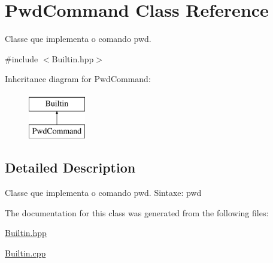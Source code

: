 \hypertarget{classPwdCommand}{
\section{PwdCommand Class Reference}
\label{classPwdCommand}
}


Classe que implementa o comando pwd.  




{\ttfamily \#include $<$Builtin.hpp$>$}

Inheritance diagram for PwdCommand:\begin{figure}[H]
\begin{center}
\leavevmode
\includegraphics[height=2.000000cm]{classPwdCommand}
\end{center}
\end{figure}


\subsection{Detailed Description}
Classe que implementa o comando pwd. Sintaxe: pwd 

The documentation for this class was generated from the following files:\begin{DoxyCompactItemize}
\item 
\hyperlink{Builtin_8hpp}{Builtin.hpp}\item 
\hyperlink{Builtin_8cpp}{Builtin.cpp}\end{DoxyCompactItemize}
